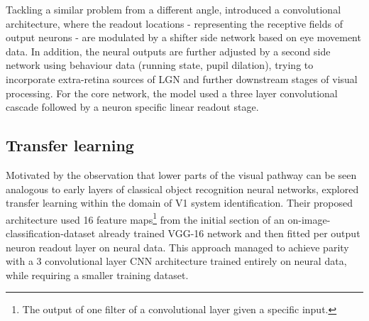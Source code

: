 Tackling a similar problem from a different angle, \cite{Walke506956} introduced a convolutional architecture, where the readout locations - representing the receptive fields of output neurons - are modulated by a shifter side network based on eye movement data. In addition, the neural outputs are further adjusted by a second side network using behaviour data (running state, pupil dilation), trying to incorporate extra-retina sources of LGN and further downstream stages of visual processing. For the core network, the model used a three layer convolutional cascade followed by a neuron specific linear readout stage. 

\subsection{Transfer learning}

Motivated by the observation that lower parts of the visual pathway can be seen analogous to early layers of classical object recognition neural networks, \cite{10.1371/journal.pcbi.1006897} explored transfer learning within the domain of V1 system identification. Their proposed architecture used 16 feature maps\footnote{The output of one filter of a convolutional layer given a specific input.} from the initial section of an on-image-classification-dataset already trained VGG-16 network \citep{VGG16} and then fitted per output neuron readout layer on neural data. This approach managed to achieve parity with a 3 convolutional layer CNN architecture trained entirely on neural data, while requiring a smaller training dataset.
